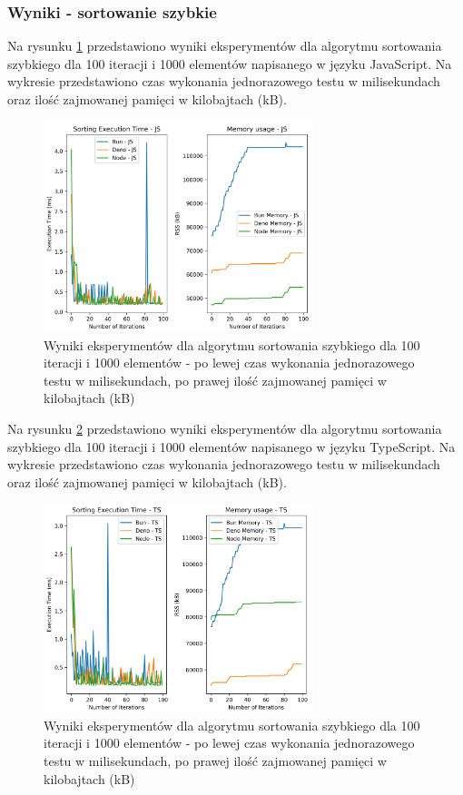 \subsubsection{Wyniki - sortowanie szybkie}
Na rysunku \ref{fig:quick_sorting_e1} przedstawiono wyniki eksperymentów dla algorytmu sortowania szybkiego dla 100 iteracji i 1000 elementów napisanego w języku JavaScript. Na wykresie przedstawiono czas wykonania jednorazowego testu w milisekundach oraz ilość zajmowanej pamięci w kilobajtach (kB).

\begin{figure}[H]
  \centering
  \includegraphics[width=0.7\textwidth]{Figures/sorting/sorting_quick_100_1000_js.png}
  \caption{Wyniki eksperymentów dla algorytmu sortowania szybkiego dla 100 iteracji i 1000 elementów - po lewej czas wykonania jednorazowego testu w milisekundach, po prawej ilość zajmowanej pamięci w kilobajtach (kB)}
  \label{fig:quick_sorting_e1}
\end{figure}

Na rysunku \ref{fig:quick_sorting_e1_ts} przedstawiono wyniki eksperymentów dla algorytmu sortowania szybkiego dla 100 iteracji i 1000 elementów napisanego w języku TypeScript. Na wykresie przedstawiono czas wykonania jednorazowego testu w milisekundach oraz ilość zajmowanej pamięci w kilobajtach (kB).

\begin{figure}[H]
  \centering
  \includegraphics[width=0.7\textwidth]{Figures/sorting/sorting_quick_100_1000_ts.png}
  \caption{Wyniki eksperymentów dla algorytmu sortowania szybkiego dla 100 iteracji i 1000 elementów - po lewej czas wykonania jednorazowego testu w milisekundach, po prawej ilość zajmowanej pamięci w kilobajtach (kB)}
  \label{fig:quick_sorting_e1_ts}
\end{figure}


